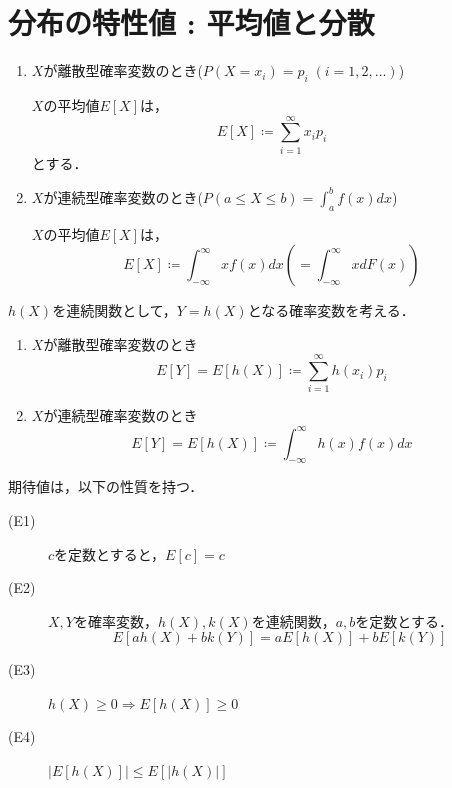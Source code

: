 \documentclass{jsreport}
\begin{document}
\section{分布の特性値 : 平均値と分散}
\begin{screen}
  \begin{defi}[平均値]
    \begin{enumerate}
      \item $X$が離散型確率変数のとき($P(X=x_i) = p_i \; (i = 1, 2, \ldots)$)

      $X$の平均値$E[X]$は，
      \begin{equation}
        E[X] \coloneqq \sum_{i = 1}^{\infty} x_i p_i \nonumber
      \end{equation}
      とする．
      \item $X$が連続型確率変数のとき($P(a \leq X \leq b) = \int_{a}^b f(x) dx$)

      $X$の平均値$E[X]$は，
      \begin{equation}
        E[X] \coloneqq \int_{-\infty}^{\infty} x f(x) dx \left(=\int_{-\infty}^{\infty} x dF(x)\right) \nonumber
      \end{equation}
    \end{enumerate}
  \end{defi}
\end{screen}

\begin{screen}
  \begin{defi}
    $h(X)$を連続関数として，$Y = h(X)$となる確率変数を考える．
    \begin{enumerate}
      \item $X$が離散型確率変数のとき
      \begin{equation}
        E[Y] = E[h(X)] \coloneqq \sum_{i=1}^{\infty} h(x_i)p_i \nonumber
      \end{equation}
      \item $X$が連続型確率変数のとき
      \begin{equation}
        E[Y] = E[h(X)] \coloneqq \int_{-\infty}^{\infty} h(x)f(x) dx \nonumber
      \end{equation}
    \end{enumerate}
  \end{defi}
\end{screen}

期待値は，以下の性質を持つ．
\begin{description}
  \item[(E1)] $c$を定数とすると，$E[c] = c$
  \item[(E2)] $X, Y$を確率変数，$h(X), k(X)$を連続関数，$a,b$を定数とする．
  \begin{equation}
    E[ah(X) + bk(Y)] = aE[h(X)] + bE[k(Y)] \nonumber
  \end{equation}
  \item[(E3)] $h(X) \geq 0 \Longrightarrow E[h(X)] \geq 0$
  \item[(E4)] $|E[h(X)]| \leq E[|h(X)|]$
\end{description}
\end{document}
